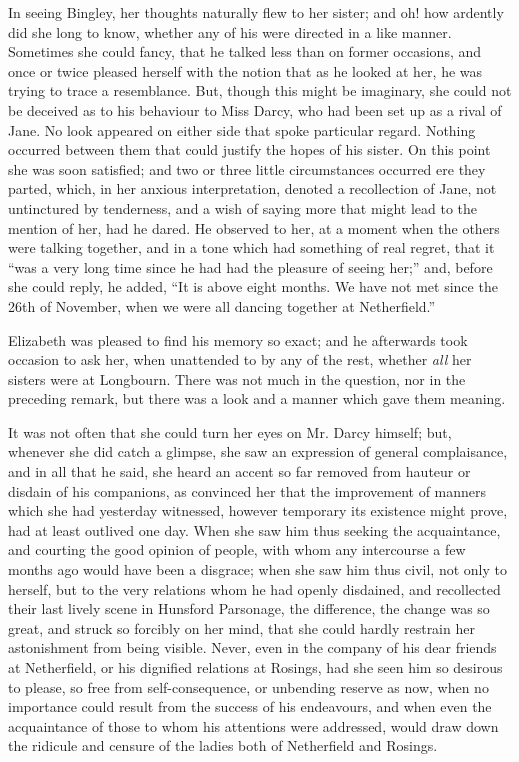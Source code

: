 In seeing Bingley, her thoughts naturally flew to her
sister; and oh! how ardently did she long to know,
whether any of his were directed in a like manner.
Sometimes she could fancy, that he talked less than on
former occasions, and once or twice pleased herself with
the notion that as he looked at her, he was trying to trace
a resemblance. But, though this might be imaginary, she
could not be deceived as to his behaviour to Miss Darcy,
who had been set up as a rival of Jane. No look appeared
on either side that spoke particular regard. Nothing
occurred between them that could justify the hopes of
his sister. On this point she was soon satisfied; and two
or three little circumstances occurred ere they parted,
which, in her anxious interpretation, denoted a recollection
of Jane, not untinctured by tenderness, and a wish of
saying more that might lead to the mention of her, had
he dared. He observed to her, at a moment when the
others were talking together, and in a tone which had
something of real regret, that it “was a very long time
since he had had the pleasure of seeing her;” and, before
she could reply, he added, “It is above eight months.
We have not met since the 26th of November, when we
were all dancing together at Netherfield.”

Elizabeth was pleased to find his memory so exact;
and he afterwards took occasion to ask her, when
unattended to by any of the rest, whether \textit{all} her sisters
were at Longbourn. There was not much in the question,
nor in the preceding remark, but there was a look and
a manner which gave them meaning.

It was not often that she could turn her eyes on Mr.
Darcy himself; but, whenever she did catch a glimpse,
she saw an expression of general complaisance, and in all
that he said, she heard an accent so far removed from
hauteur or disdain of his companions, as convinced her
that the improvement of manners which she had yesterday
witnessed, however temporary its existence might prove,
had at least outlived one day. When she saw him thus
seeking the acquaintance, and courting the good opinion
of people, with whom any intercourse a few months ago
would have been a disgrace; when she saw him thus civil,
not only to herself, but to the very relations whom he had
openly disdained, and recollected their last lively scene
in Hunsford Parsonage, the difference, the change was
so great, and struck so forcibly on her mind, that she
could hardly restrain her astonishment from being visible.
Never, even in the company of his dear friends at Netherfield,
or his dignified relations at Rosings, had she seen
him so desirous to please, so free from self-consequence,
or unbending reserve as now, when no importance could
result from the success of his endeavours, and when even
the acquaintance of those to whom his attentions were
addressed, would draw down the ridicule and censure of
the ladies both of Netherfield and Rosings.

